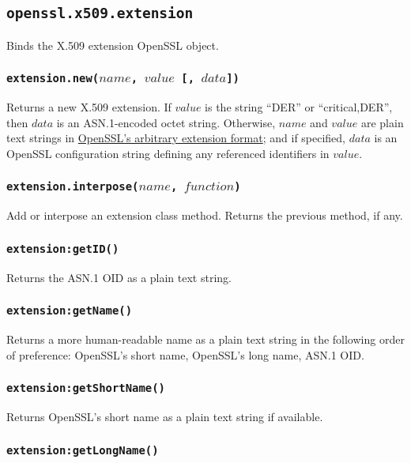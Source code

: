 \documentclass[11pt, oneside]{memoir}
\newcommand*{\fn}[1]{\texttt{#1}\xspace}
\newcounter{toccols}
\newenvironment{Module}[1]{
	\subsection{\texttt{#1}}
	\addtocontents{toc}{
		\protect\begin{multicols}{\value{toccols}}
	}
}{
	\addtocontents{toc}{\protect\end{multicols}}
}
\begin{document}
\begin{Module}{openssl.x509.extension}

Binds the X.509 extension OpenSSL object.

\subsubsection[\fn{extension.new}]{\fn{extension.new($name$, $value$ [, $data$])}}

Returns a new X.509 extension. If $value$ is the string ``DER'' or ``critical,DER'', then $data$ is an ASN.1-encoded octet string. Otherwise, $name$ and $value$ are plain text strings in \href{https://www.openssl.org/docs/apps/x509v3_config.html#ARBITRARY_EXTENSIONS}{OpenSSL's arbitrary extension format}; and if specified, $data$ is an OpenSSL configuration string defining any referenced identifiers in $value$.

\subsubsection[\fn{extension.interpose}]{\fn{extension.interpose($name$, $function$)}}

Add or interpose an extension class method. Returns the previous method, if any.

\subsubsection[\fn{extension:getID}]{\fn{extension:getID()}}

Returns the ASN.1 OID as a plain text string.

\subsubsection[\fn{extension:getName}]{\fn{extension:getName()}}

Returns a more human-readable name as a plain text string in the following order of preference: OpenSSL's short name, OpenSSL's long name, ASN.1 OID.

\subsubsection[\fn{extension:getShortName}]{\fn{extension:getShortName()}}

Returns OpenSSL's short name as a plain text string if available.

\subsubsection[\fn{extension:getLongName}]{\fn{extension:getLongName()}}


\end{Module}
\end{document}
